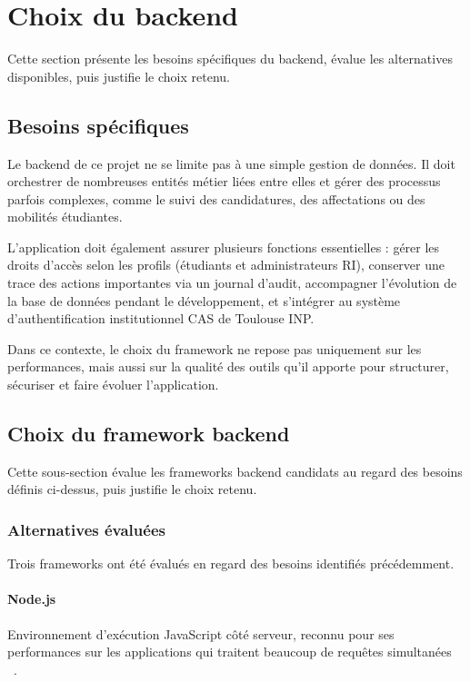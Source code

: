 \section{Choix du backend}

Cette section présente les besoins spécifiques du backend, évalue les
alternatives disponibles, puis justifie le choix retenu.

\subsection{Besoins spécifiques}

Le backend de ce projet ne se limite pas à une simple gestion de données. Il doit orchestrer de nombreuses entités métier liées entre elles et gérer des processus parfois complexes, comme le suivi des candidatures, des affectations ou des mobilités étudiantes.

L'application doit également assurer plusieurs fonctions essentielles : gérer les droits d'accès selon les profils (étudiants et administrateurs RI), conserver une trace des actions importantes via un journal d'audit, accompagner l'évolution de la base de données pendant le développement, et s'intégrer au système d'authentification institutionnel CAS de Toulouse INP.

Dans ce contexte, le choix du framework ne repose pas uniquement sur les performances, mais aussi sur la qualité des outils qu'il apporte pour structurer, sécuriser et faire évoluer l'application.

\subsection{Choix du framework backend}

Cette sous-section évalue les frameworks backend candidats au regard des besoins définis ci-dessus, puis justifie le choix retenu.

\subsubsection{Alternatives évaluées}

Trois frameworks ont été évalués en regard des besoins identifiés précédemment.

\paragraph{Node.js}
Environnement d'exécution JavaScript côté serveur,
reconnu pour ses performances sur les applications
qui traitent beaucoup de requêtes simultanées ~\cite{nodejs_dev}.

